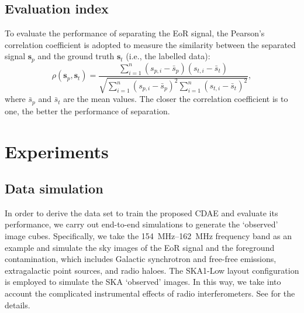\documentclass[letters,a4paper,fleqn,usenatbib]{mnras}
\begin{document}
\subsection{Evaluation index}
\label{sec:index}

To evaluate the performance of separating the EoR signal, the Pearson's
correlation coefficient is adopted to measure the similarity between
the separated signal $\mathbf{s}_p$ and the ground truth $\mathbf{s}_t$
(i.e., the labelled data):
\begin{equation}
  \label{eq:corrcoef}
  \rho(\mathbf{s}_p, \mathbf{s}_t) =
    \frac{\sum_{i=1}^{n}(s_{p,i}-\bar{s}_p)(s_{t,i}-\bar{s}_t)}{
      \sqrt{\sum_{i=1}^{n}(s_{p,i}-\bar{s}_p)^2
        \sum_{i=1}^{n}(s_{t,i}-\bar{s}_t)^2}
    },
\end{equation}
where $\bar{s}_p$ and $\bar{s}_t$ are the mean values.
The closer the correlation coefficient is to one, the better the
performance of separation.


\section{Experiments}
\label{sec:experiments}

\subsection{Data simulation}
\label{sec:simulation}

In order to derive the data set to train the proposed CDAE and evaluate
its performance, we carry out end-to-end simulations to generate the
`observed' image cubes.
Specifically, we take the \SIrange{154}{162}{\MHz} frequency band as an
example and simulate the sky images of the EoR signal and the foreground
contamination, which includes Galactic synchrotron and free-free
emissions, extragalactic point sources, and radio haloes.
The SKA1-Low layout configuration is employed to simulate the SKA
`observed' images.
In this way, we take into account the complicated instrumental effects
of radio interferometers.
See \citet{li2018} for the details.
\end{document}
